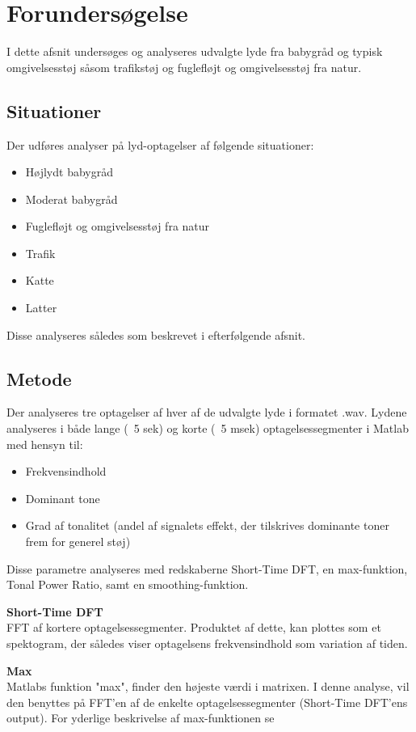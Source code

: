 \section{Forundersøgelse}

I dette afsnit undersøges og analyseres udvalgte lyde fra babygråd og typisk omgivelsesstøj såsom trafikstøj og fuglefløjt og omgivelsesstøj fra natur.

\subsection*{Situationer}
Der udføres analyser på lyd-optagelser af følgende situationer:
\begin{itemize}
	\item Højlydt babygråd
	\item Moderat babygråd
	\item Fuglefløjt og omgivelsesstøj fra natur
	\item Trafik
	\item Katte
	\item Latter 
\end{itemize} 
Disse analyseres således som beskrevet i efterfølgende afsnit.

\subsection{Metode}
Der analyseres tre optagelser af hver af de udvalgte lyde i formatet .wav. Lydene analyseres i både lange (~5 sek) og korte (~5 msek) optagelsessegmenter i Matlab med hensyn til:
\begin{itemize}
	\item Frekvensindhold
	\item Dominant tone
	\item Grad af tonalitet (andel af signalets effekt, der tilskrives dominante toner frem for generel støj) 
\end{itemize} 

Disse parametre analyseres med redskaberne Short-Time DFT, en max-funktion, Tonal Power Ratio, samt en smoothing-funktion.

\textbf{Short-Time DFT} \\
FFT af kortere optagelsessegmenter. Produktet af dette, kan plottes som et spektogram, der således viser optagelsens frekvensindhold som variation af tiden.

\textbf{Max} \\
Matlabs funktion "max", finder den højeste værdi i matrixen. I denne analyse, vil den benyttes på FFT'en af de enkelte optagelsessegmenter (Short-Time DFT'ens output). For yderlige beskrivelse af max-funktionen se \citep{website:max}

